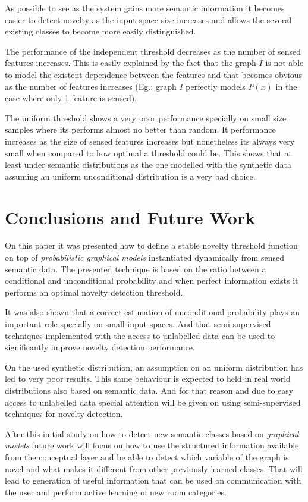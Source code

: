 \documentclass[runningheads,a4paper]{llncs}
\begin{document}
As possible to see as the system gains more semantic information it becomes easier
to detect novelty as the input space size increases and allows the several existing
classes to become more easily distinguished.

The performance of the independent threshold decreases as the number of sensed
features increases. This is easily explained by the fact that the graph $I$ is not
able to model the existent dependence between the features and that becomes obvious
as the number of features increases (Eg.: graph $I$ perfectly models $P(x)$ in the
case where only 1 feature is sensed).

The uniform threshold shows a very poor performance specially on small size samples
where its performs almost no better than random.
It performance increases as the size of sensed features increases but nonetheless
its always very small when compared to how optimal a threshold could be.
This shows that at least under semantic distributions as the one modelled with the
synthetic data assuming an uniform unconditional distribution is a very bad choice.




\section{Conclusions and Future Work}
On this paper it was presented how to define a stable novelty threshold function on
top of \emph{probabilistic graphical models} instantiated dynamically from sensed
semantic data.
The presented technique is based on the ratio between a conditional and
unconditional probability and when perfect information exists it performs an optimal
novelty detection threshold.

It was also shown that a correct estimation of unconditional probability plays an
important role specially on small input spaces. And that semi-supervised techniques
implemented with the access to unlabelled data can be used to significantly improve
novelty detection performance.

On the used synthetic distribution, an assumption on an uniform
distribution has led to very poor results. This same behaviour is expected to held
in real world distributions also based on semantic data. And for that reason
and due to easy access to unlabelled data special attention will be given on using
semi-supervised techniques for novelty detection.

After this initial study on how to detect new semantic classes based on
\emph{graphical models} future work will focus on how to use the structured
information available from the conceptual layer and be able to detect which variable
of the graph is novel and what makes it different from other previously learned
classes. That will lead to generation of useful information that can be used on
communication with the user and perform active learning of new room categories.




\end{document}
